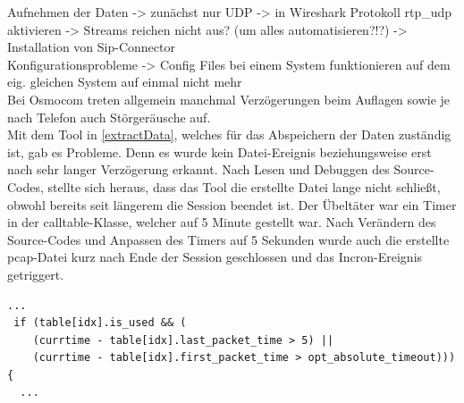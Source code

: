 Aufnehmen der Daten -> zunächst nur UDP -> in Wireshark Protokoll rtp\_udp aktivieren -> Streams reichen nicht aus? (um alles automatisieren?!?) -> Installation von Sip-Connector\\

Konfigurationsprobleme -> Config Files bei einem System funktionieren auf dem eig. gleichen System auf einmal nicht mehr\\

Bei Osmocom treten allgemein manchmal Verzögerungen beim Auflagen sowie je nach Telefon auch Störgeräusche auf.\\



Mit dem Tool in \ref{extractData}, welches für das Abspeichern der Daten zuständig ist, gab es Probleme. Denn es wurde kein Datei-Ereignis beziehungsweise erst nach sehr langer Verzögerung erkannt. Nach Lesen und Debuggen des Source-Codes, stellte sich heraus, dass das Tool die erstellte Datei lange nicht schließt, obwohl bereits seit längerem die Session beendet ist. Der Übeltäter war ein Timer in der calltable-Klasse, welcher auf 5 Minute gestellt war. Nach Verändern des Source-Codes und Anpassen des Timers auf 5 Sekunden wurde auch die erstellte pcap-Datei kurz nach Ende der Session geschlossen und das Incron-Ereignis getriggert.

\begin{lstlisting}[xleftmargin=.04\textwidth, firstnumber=211]
  ...
 if (table[idx].is_used && (
 	(currtime - table[idx].last_packet_time > 5) ||
    (currtime - table[idx].first_packet_time > opt_absolute_timeout))){
  ...
\end{lstlisting}
